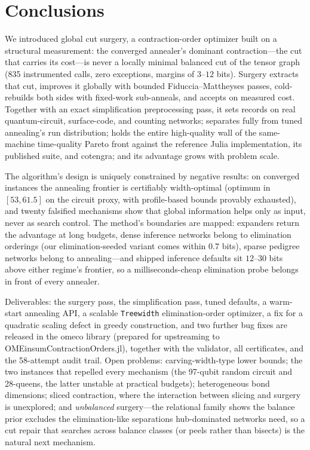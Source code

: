 \documentclass{SciPost}
\begin{document}
\section{Conclusions}
\label{sec:conclusions}

We introduced global cut surgery, a contraction-order optimizer built on
a structural measurement: the converged annealer's dominant
contraction---the cut that carries its cost---is never a locally minimal
balanced cut of the tensor graph (835 instrumented calls, zero
exceptions, margins of $3$--$12$ bits). Surgery extracts that cut,
improves it globally with bounded Fiduccia--Mattheyses passes,
cold-rebuilds both sides with fixed-work sub-anneals, and accepts on
measured cost. Together with an exact simplification preprocessing pass,
it sets records on real quantum-circuit, surface-code, and counting
networks; separates fully from tuned annealing's run distribution;
holds the entire high-quality wall of the same-machine time-quality
Pareto front against the reference Julia implementation, its published
suite, and cotengra; and its advantage grows with problem scale.

The algorithm's design is uniquely constrained by negative results: on
converged instances the annealing frontier is certifiably
width-optimal (optimum in $[53, 61.5]$ on the circuit proxy, with
profile-based bounds provably exhausted), and twenty falsified
mechanisms show that global information helps only as input, never as
search control. The method's boundaries are mapped: expanders return
the advantage at long budgets, dense inference networks belong to
elimination orderings (our elimination-seeded variant comes within
$0.7$ bits), sparse pedigree networks belong to annealing---and shipped
inference defaults sit $12$--$30$ bits above either regime's frontier,
so a milliseconds-cheap elimination probe belongs in front of every
annealer.

Deliverables: the surgery pass, the simplification pass, tuned defaults,
a warm-start annealing API, a scalable \texttt{Treewidth}
elimination-order optimizer, a fix for a quadratic scaling defect in
greedy construction, and two further bug fixes are released in the
omeco library (prepared for upstreaming to
OMEinsumContractionOrders.jl), together with the validator, all
certificates, and the 58-attempt audit trail. Open problems:
carving-width-type lower bounds; the two
instances that repelled every mechanism (the 97-qubit random circuit
and 28-queens, the latter unstable at practical budgets); heterogeneous
bond dimensions; sliced contraction, where the interaction between
slicing and surgery is unexplored; and \emph{unbalanced} surgery---the
relational family shows the balance prior excludes the elimination-like
separations hub-dominated networks need, so a cut repair that searches
across balance classes (or peels rather than bisects) is the natural
next mechanism.
\end{document}
